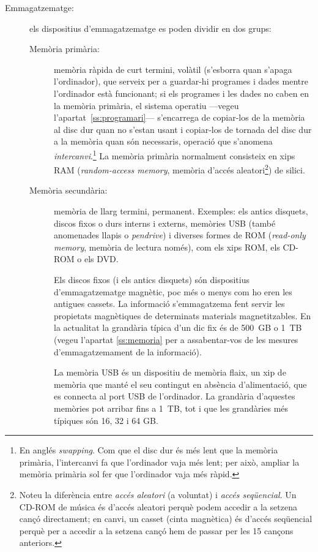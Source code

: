 \begin{description}
\item[Emmagatzematge:] els dispositius d'emmagatzematge es poden
  dividir en dos grups:
  \begin{description}
  \item[Memòria primària:] memòria ràpida de curt termini, volàtil
    (s'esborra quan s'apaga l'ordinador), que serveix per a guardar-hi
    programes i dades mentre l'ordinador està funcionant; si els
    programes i les dades no caben en la memòria primària, el sistema
    operatiu ---vegeu l'apartat~\ref{ss:programari}--- s'encarrega de
    copiar-los de la memòria al disc dur quan no s'estan usant i
    copiar-los de tornada del disc dur a la memòria quan són
    necessaris, operació que s'anomena \emph{intercanvi}.\footnote{En
      anglés \emph{swapping}. Com que el disc dur és més lent que la
      memòria primària, l'intercanvi fa que l'ordinador vaja més lent;
      per això, ampliar la memòria primària sol fer que l'ordinador
      vaja més ràpid.} La memòria primària normalment consisteix en
    xips RAM (\emph{random-access memory}, memòria d'accés
    aleatori\footnote{Noteu la diferència entre \emph{accés aleatori}
      (a voluntat) i \emph{accés seqüencial}. Un CD-ROM de música és
      d'accés aleatori perquè podem accedir a la setzena cançó
      directament; en canvi, un casset (cinta magnètica) és d'accés
      seqüencial perquè per a accedir a la setzena cançó hem de passar
      per les 15 cançons anteriors.}) de silici.
    
  \item[Memòria secundària:] memòria de llarg termini, permanent.
    Exemples: els antics disquets, discos fixos o durs interns i
    externs, memòries USB (també anomenades llapis o \emph{pendrive})
    i diverses formes de ROM (\emph{read-only memory}, memòria de
    lectura només), com els xips ROM, els CD-ROM o els DVD.  

    Els discos fixos (i els antics disquets) són dispositius
    d'emmagatzematge magnètic, poc més o menys com ho eren les
    antigues cassets. La informació s'emmagatzema fent servir les
    propietats magnètiques de determinats materials magnetitzables. En
    la actualitat la grandària típica d'un dic fix és de 500~GB o 1~TB
    (vegeu l'apartat \ref{ss:memoria} per a assabentar-vos de les
    mesures d'emmagatzemament de la informació).

    La memòria USB és un dispositiu de memòria flaix, un xip de
    memòria que manté el seu contingut en absència d'alimentació, que
    es connecta al port USB de l'ordinador. La grandària d'aquestes
    memòries pot arribar fins a 1~TB, tot i que les grandàries més
    típiques són 16, 32 i 64 GB.


\end{description}
\end{description}
